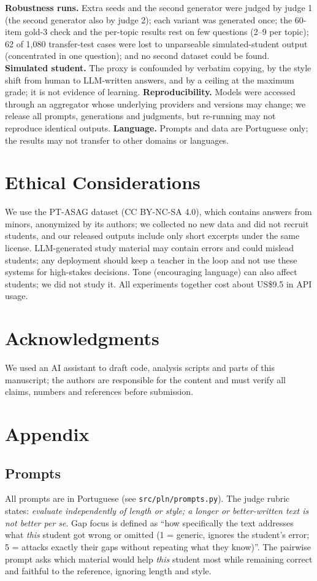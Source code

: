 \documentclass[11pt]{article}
\begin{document}
\textbf{Robustness runs.} Extra seeds and the second generator were judged by judge 1 (the second generator also by judge 2); each variant was generated once; the 60-item gold-3 check and the per-topic results rest on few questions (2--9 per topic); 62 of 1{,}080 transfer-test cases were lost to unparseable simulated-student output (concentrated in one question); and no second dataset could be found.
\textbf{Simulated student.} The proxy is confounded by verbatim copying, by the style shift from human to LLM-written answers, and by a ceiling at the maximum grade; it is not evidence of learning.
\textbf{Reproducibility.} Models were accessed through an aggregator whose underlying providers and versions may change; we release all prompts, generations and judgments, but re-running may not reproduce identical outputs.
\textbf{Language.} Prompts and data are Portuguese only; the results may not transfer to other domains or languages.

\section*{Ethical Considerations}
We use the PT-ASAG dataset (CC BY-NC-SA 4.0), which contains answers from minors, anonymized by its authors; we collected no new data and did not recruit students, and our released outputs include only short excerpts under the same license. LLM-generated study material may contain errors and could mislead students; any deployment should keep a teacher in the loop and not use these systems for high-stakes decisions. Tone (encouraging language) can also affect students; we did not study it. All experiments together cost about US\$9.5 in API usage.

\section*{Acknowledgments}
We used an AI assistant to draft code, analysis scripts and parts of this manuscript; the authors are responsible for the content and must verify all claims, numbers and references before submission.




\appendix
\section{Appendix}
\label{app:prompts}

\subsection{Prompts}
All prompts are in Portuguese (see \texttt{src/pln/prompts.py}). The judge rubric states: \emph{evaluate independently of length or style; a longer or better-written text is not better per se}. Gap focus is defined as ``how specifically the text addresses what \emph{this} student got wrong or omitted (1 = generic, ignores the student's error; 5 = attacks exactly their gaps without repeating what they know)''. The pairwise prompt asks which material would help \emph{this} student most while remaining correct and faithful to the reference, ignoring length and style.
\end{document}
